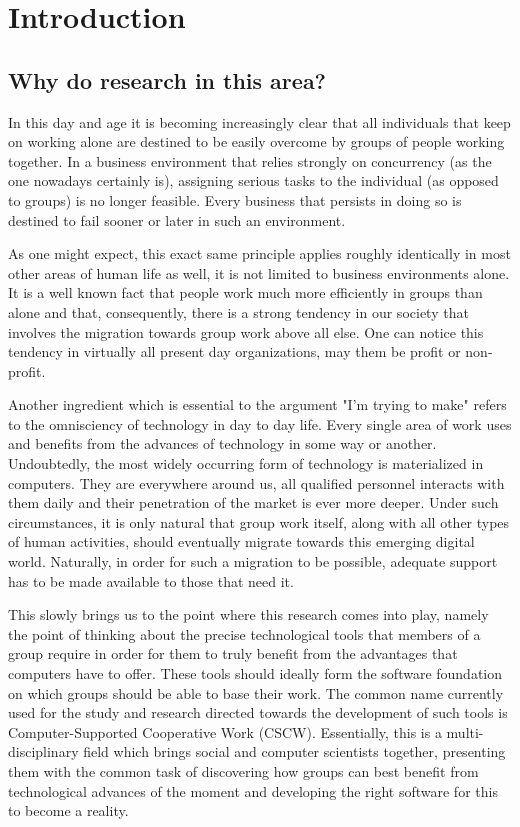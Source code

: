 \chapter{Introduction}

\section{Why do research in this area?}

In this day and age it is becoming increasingly clear that all individuals that keep on working
alone are destined to be easily overcome by groups of people working together. In a business environment
that relies strongly on concurrency (as the one nowadays certainly is), assigning serious tasks to the
individual (as opposed to groups) is no longer feasible. Every business that persists in doing so
is destined to fail sooner or later in such an environment.

As one might expect, this exact same principle applies roughly identically in most other areas of human
life as well, it is not limited to business environments alone. It is a well known fact that people work
much more efficiently in groups than alone and that, consequently, there is a strong tendency in our society
that involves the migration towards group work above all else. One can notice this tendency in virtually all
present day organizations, may them be profit or non-profit.

Another ingredient which is essential to the argument "I'm trying to make" refers to the omnisciency of technology
in day to day life. Every single area of work uses and benefits from the advances of technology in some way or
another. Undoubtedly, the most widely occurring form of technology is materialized in computers. They are everywhere
around us, all qualified personnel interacts with them daily and their penetration of the market is ever more deeper.
Under such circumstances, it is only natural that group work itself, along with all other types of human activities,
should eventually migrate towards this emerging digital world. Naturally, in order for such a migration to be
possible, adequate support has to be made available to those that need it. 

This slowly brings us to the point where this research comes into play, namely the point of thinking about the precise
technological tools that members of a group require in order for them to truly benefit from the advantages that
computers have to offer. These tools should ideally form the software foundation on which groups should be able to
base their work. The common name currently used for the study and research directed towards the development of
such tools is Computer-Supported Cooperative Work (CSCW). Essentially, this is a multi-disciplinary
field which brings social and computer scientists together, presenting them with the common task of discovering how
groups can best benefit from technological advances of the moment and developing the right software for this to become
a reality.

